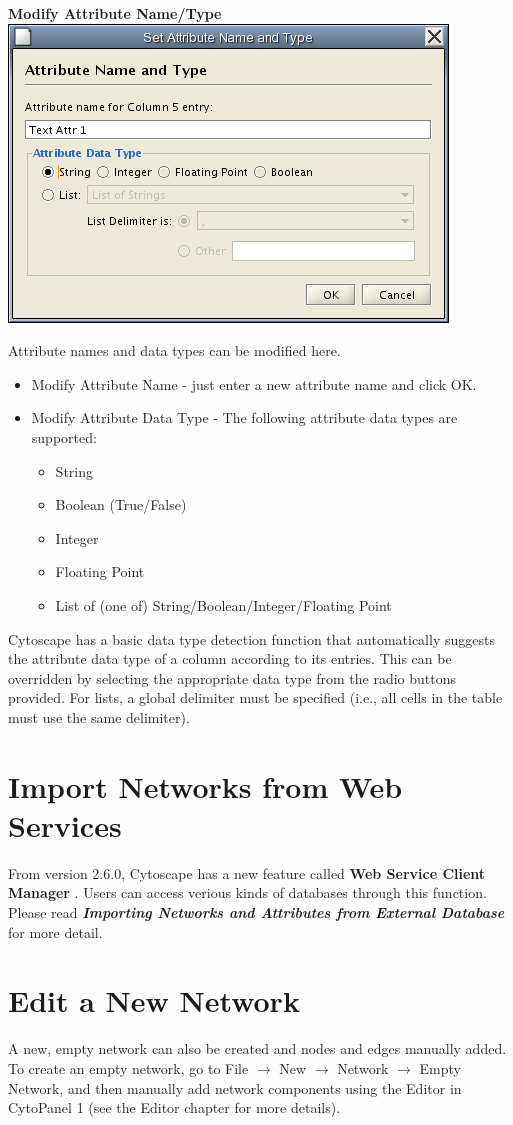 \textbf{Modify Attribute Name/Type}
 \includegraphics[wdith=\textwidth]{images/network_table_attr_dialog1.png} 

 Attribute names and data types can be modified here. 
\begin{itemize}
\item Modify Attribute Name - just enter a new attribute name and click OK. 
\item Modify Attribute Data Type - The following attribute data types are supported: \begin{itemize}
\item String 
\item Boolean (True/False) 
\item Integer 
\item Floating Point 
\item List of (one of) String/Boolean/Integer/Floating Point 
\end{itemize}
\end{itemize}
 Cytoscape has a basic data type detection function that automatically suggests the attribute data type of a column according to its entries. This can be overridden by selecting the appropriate data type from the radio buttons provided. For lists, a global delimiter must be specified (i.e., all cells in the table must use the same delimiter). 

\section{Import Networks from Web Services}

 From version 2.6.0, Cytoscape has a new feature called \textbf{Web Service Client Manager}
. Users can access verious kinds of databases through this function. Please read \emph{\textbf{Importing Networks and Attributes from External Database}
}
 for more detail. 

\section{Edit a New Network}

 A new, empty network can also be created and nodes and edges manually added. To create an empty network, go to File $\rightarrow$ New $\rightarrow$ Network $\rightarrow$ Empty Network, and then manually add network components using the Editor in CytoPanel 1 (see the Editor chapter for more details). 
